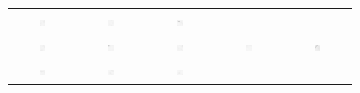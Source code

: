 \begin{figure}
\begin{subfigure}{\textwidth}
\begin{tabular}{c@{\,}c@{\,}c@{\,}c@{\,}c@{}}
			\includegraphics[width=0.1\textwidth]{fig01c03} &
			\includegraphics[width=0.1\textwidth]{fig01c04} &
			\includegraphics[width=0.1\textwidth]{fig01c05} \\
			\includegraphics[width=0.1\textwidth]{fig01c06} &
			\includegraphics[width=0.1\textwidth]{fig01c07} &
			\includegraphics[width=0.1\textwidth]{fig01c08} &
			\includegraphics[width=0.1\textwidth]{fig01c09} &
			\includegraphics[width=0.1\textwidth]{fig01c10} \\
			\includegraphics[width=0.1\textwidth]{fig01c11} &
			\includegraphics[width=0.1\textwidth]{fig01c12} &
			\includegraphics[width=0.1\textwidth]{fig01c13} &

\end{tabular}
\end{subfigure}
\end{figure}

